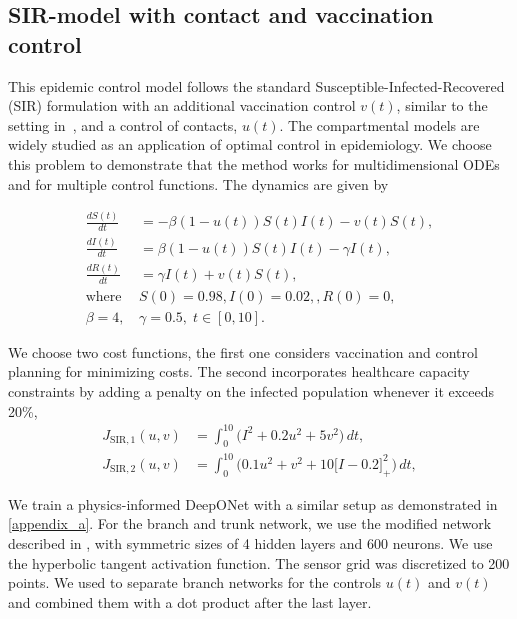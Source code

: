 \documentclass[final,1p,times]{elsarticle}
\theoremstyle{plain} %
\theoremstyle{definition} %
\theoremstyle{remark} %
\begin{document}
\subsection{SIR-model with contact and vaccination control}
This epidemic control model follows the standard Susceptible-Infected-Recovered (SIR) formulation with an additional vaccination control $v(t)$, similar to the setting in~\cite{Marinov2022}, and a control of contacts, $u(t)$. The compartmental models are widely studied as an application of optimal control in epidemiology. We choose this problem to demonstrate that the method works for multidimensional ODEs and for multiple control functions. The dynamics are given by

  \begin{equation}\label{eq:sir}
  \begin{aligned}
    \frac{dS(t)}{dt} &= -\beta(1-u(t))S(t)I(t) - v(t)S(t),\\
    \frac{dI(t)}{dt} &= \beta(1-u(t))S(t)I(t) - \gamma I(t),\\
    \frac{dR(t)}{dt} &= \gamma I(t) + v(t)S(t),\\
    \text{where }
    & S(0) = 0.98, I(0) = 0.02,,R(0) = 0,\\ 
    \beta=4,\, &\gamma=0.5,\; t \in [0,10].
  \end{aligned}
  \end{equation}

We choose two cost functions, the first one considers vaccination and control planning for minimizing costs. The second incorporates healthcare capacity constraints by adding a penalty on the infected population whenever it exceeds 20\%,
  \begin{subequations}\label{cost:sir}
  \begin{align}
    J_{\mathrm{SIR},1}(u,v)
      &= \int_0^{10} \!\Big( I^2 + 0.2 u^2 + 5 v^2 \Big)\,dt, \label{cost:sir:a}\\
    J_{\mathrm{SIR},2}(u,v)
    &= \int_0^{10} \!\Big(0.1 u^2 + v^2 + 10\bigl[I-0.2\bigr]_+^2 \Big)\,dt, \label{cost:sir:b}
  \end{align}
  \end{subequations}

We train a physics-informed DeepONet with a similar setup as demonstrated in \ref{appendix_a}. For the branch and trunk network, we use the modified network described in \cite{wang2021learning}, with symmetric sizes of 4 hidden layers and 600 neurons. We use the hyperbolic tangent activation function. The sensor grid was discretized to 200 points. We used to separate branch networks for the controls $u(t)$ and $v(t)$ and combined them with a dot product after the last layer.
\end{document}
